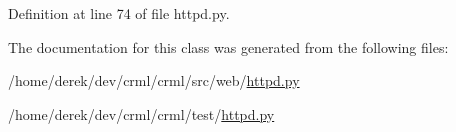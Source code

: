 Definition at line 74 of file httpd.py.



The documentation for this class was generated from the following files:\begin{DoxyCompactItemize}
\item 
/home/derek/dev/crml/crml/src/web/\hyperlink{src_2web_2httpd_8py}{httpd.py}\item 
/home/derek/dev/crml/crml/test/\hyperlink{test_2httpd_8py}{httpd.py}\end{DoxyCompactItemize}
